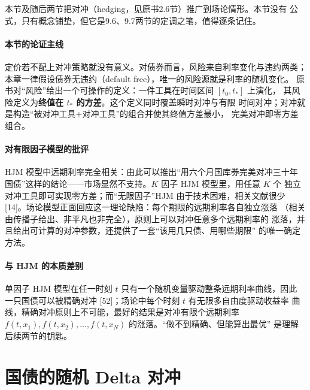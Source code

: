 本节及随后两节把对冲（hedging，见原书2.6节）推广到场论情形。本节没有
公式，只有概念铺垫，但它是9.6、9.7两节的定调之笔，值得逐条记住。

\paragraph{本节的论证主线}
定价若不配上对冲策略就没有意义。对债券而言，风险来自利率变化与违约两类；
本章一律假设债券无违约（default free），唯一的风险源就是利率的随机变化。
原书对“风险”给出一个可操作的定义：一件工具在时间区间 $[t_0,t_*]$ 上演化，
其风险定义为\textbf{终值在 $t_*$ 的方差}。这个定义同时覆盖瞬时对冲与有限
时间对冲；对冲就是构造“被对冲工具+对冲工具”的组合并使其终值方差最小，
完美对冲即零方差组合。

\paragraph{对有限因子模型的批评}
HJM 模型中远期利率完全相关：由此可以推出“用六个月国库券完美对冲三十年
国债”这样的结论——市场显然不支持。$K$ 因子 HJM 模型里，用任意 $K$ 个
独立对冲工具即可实现零方差；而“无限因子”HJM 由于技术困难，相关文献很少
[14]。场论模型正面回应这一理论缺陷：每个期限的远期利率各自独立涨落
（相关由传播子给出、非平凡也非完全），原则上可以对冲任意多个远期利率的
涨落，并且给出可计算的对冲参数，还提供了一套“该用几只债、用哪些期限”
的唯一确定方法。

\paragraph{与 HJM 的本质差别}
单因子 HJM 模型在任一时刻 $t$ 只有一个随机变量驱动整条远期利率曲线，因此
一只国债可以被精确对冲 [52]；场论中每个时刻 $t$ 有无限多自由度驱动收益率
曲线，精确对冲原则上不可能，最好的结果是对冲有限个远期利率
$f(t,x_1),f(t,x_2),\dots,f(t,x_N)$ 的涨落。“做不到精确、但能算出最优”
是理解后续两节的钥匙。

\section{国债的随机 Delta 对冲}

